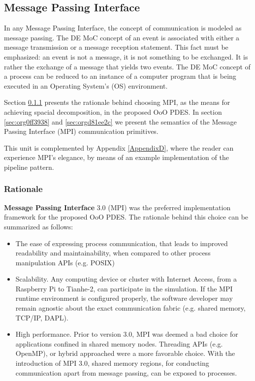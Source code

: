 \documentclass[11pt]{article}
\begin{document}
\subsection{Message Passing Interface}
\label{sec:org12eae92}
In any Message Passing Interface, the concept of communication is modeled as message passing.
The DE MoC concept of an event is associated with either a message transmission or a message reception statement.
This fact must be emphasized: an event is not a message, it is not something to be exchanged.
It is rather the exchange of a message that yields two events.
The DE MoC concept of a process can be reduced to an instance of a computer program that is being executed \cite{Tanenbaum1998} in an Operating System's (OS) environment.

Section \ref{sec:org0eaab05} presents the rationale behind choosing MPI, as the means for achieving spacial decomposition, in the proposed OoO PDES.
In section \ref{sec:org0ff3938} and \ref{sec:orgd81ee2c} we present the semantics of the Message Passing Interface (MPI) communication primitives.

This unit is complemented by Appendix \ref{AppendixD}, where the reader can experience MPI's elegance, by means of an example implementation of the pipeline pattern.

\subsubsection{Rationale}
\label{sec:org0eaab05}
\textbf{Message Passing Interface} 3.0 (MPI) \cite{MessagePassingInterfaceForum2012} was the preferred implementation framework for the proposed OoO PDES.
The rationale behind this choice can be summarized as follows:
\begin{itemize}
\item The ease of expressing process communication, that leads to improved readability and maintainability, when compared to other process manipulation APIs (e.g. POSIX)
\item Scalability. Any computing device or cluster with Internet Access, from a Raspberry Pi to Tianhe-2, can participate in the simulation.
If the MPI runtime environment is configured properly, the software developer may remain agnostic about the exact communication fabric (e.g. shared memory, TCP/IP, DAPL).
\item High performance. Prior to version 3.0, MPI was deemed a bad choice for applications confined in shared memory nodes. 
Threading APIs (e.g. OpenMP), or hybrid approached were a more favorable choice.   
With the introduction of MPI 3.0, shared memory regions, for conducting communication apart from message passing, can be exposed to processes.
\end{itemize}
\end{document}
